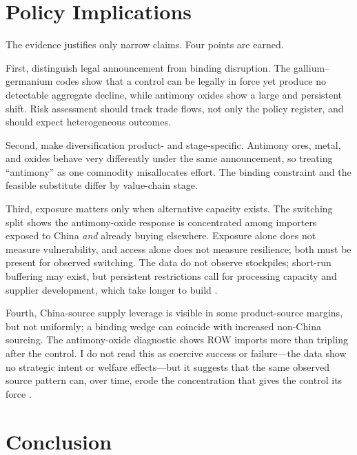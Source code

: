 \documentclass[12pt,a4paper]{article}
\begin{document}
\section{Policy Implications}\label{sec:policy}

The evidence justifies only narrow claims. Four points are earned.

First, distinguish legal announcement from binding disruption. The
gallium--germanium codes show that a control can be legally in force yet produce
no detectable aggregate decline, while antimony oxides show a large and
persistent shift. Risk assessment should track trade flows, not only the policy
register, and should expect heterogeneous outcomes.

Second, make diversification product- and stage-specific. Antimony ores, metal,
and oxides behave very differently under the same announcement, so treating
``antimony'' as one commodity misallocates effort. The binding constraint and the
feasible substitute differ by value-chain stage.

Third, exposure matters only when alternative capacity exists. The switching
split shows the antimony-oxide response is concentrated among importers exposed
to China \emph{and} already buying elsewhere. Exposure alone does not measure
vulnerability, and access alone does not measure resilience; both must be
present for observed switching. The data do not observe stockpiles; short-run
buffering may exist, but persistent restrictions call for processing capacity and
supplier development, which take longer to build \citep{vandenbrink2022antimony_resilience,
xu2025antimony_material_flow}.

Fourth, China-source supply leverage is visible in some product-source margins, but not uniformly; a binding
wedge can coincide with increased non-China sourcing. The antimony-oxide
diagnostic shows ROW imports more than tripling after the control. I do not read
this as coercive success or failure---the data show no strategic intent or
welfare effects---but it suggests that the same observed source pattern can, over
time, erode the concentration that gives the control its force
\citep{iea_2025_global_critical_minerals_outlook}.

\section{Conclusion}\label{sec:conclusion}
\end{document}
